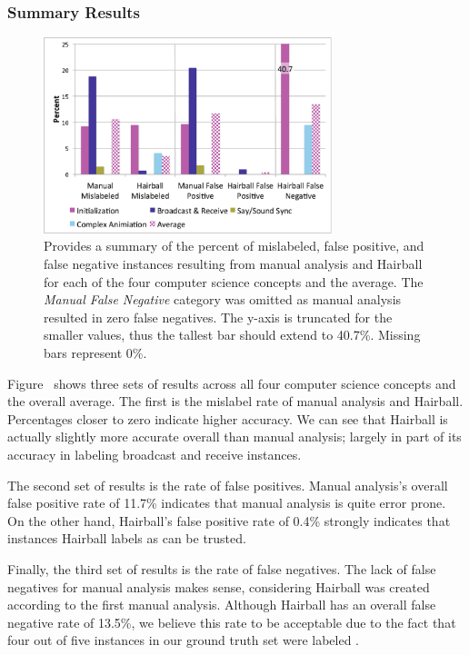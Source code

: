 \subsubsection{Summary Results}
\begin{figure}[!t]
\centering \includegraphics[trim=.3in .15in .3in .15in, clip,
  width=3.3in]{graphs/AutoSummary.eps}
\caption{Provides a summary of the percent of mislabeled, false positive, and
  false negative instances resulting from manual analysis and Hairball for each
  of the four computer science concepts and the average. The \emph{Manual False
    Negative} category was omitted as manual analysis resulted in zero false
  negatives. The y-axis is truncated for the smaller values, thus the tallest
  bar should extend to 40.7\%. Missing bars represent 0\%.}
\end{figure}

Figure~ shows three sets of results across all four
computer science concepts and the overall average. The first is the mislabel
rate of manual analysis and Hairball. Percentages closer to zero indicate
higher accuracy. We can see that Hairball is actually slightly more accurate
overall than manual analysis; largely in part of its accuracy in labeling
broadcast and receive instances.

The second set of results is the rate of false positives. Manual analysis's
overall false positive rate of 11.7\% indicates that manual analysis is quite
error prone. On the other hand, Hairball's false positive rate of 0.4\%
strongly indicates that instances Hairball labels as \correct{} can be trusted.

Finally, the third set of results is the rate of false negatives. The lack of
false negatives for manual analysis makes sense, considering Hairball was
created according to the first manual analysis. Although Hairball has an
overall false negative rate of 13.5\%, we believe this rate to be acceptable
due to the fact that four out of five instances in our ground truth set were
labeled \correct{}.
